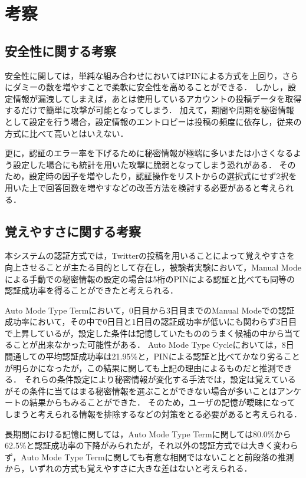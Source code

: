 \chapter{考察}\label{chap:discussion}
\section{安全性に関する考察}\label{sec:safety}
安全性に関しては，単純な組み合わせにおいてはPINによる方式を上回り，さらにダミーの数を増やすことで柔軟に安全性を高めることができる．
しかし，設定情報が漏洩してしまえば，あとは使用しているアカウントの投稿データを取得するだけで簡単に攻撃が可能となってしまう．
加えて，期間や周期を秘密情報として設定を行う場合，設定情報のエントロピーは投稿の頻度に依存し，従来の方式に比べて高いとはいえない．

更に，認証のエラー率を下げるために秘密情報が極端に多いまたは小さくなるよう設定した場合にも統計を用いた攻撃に脆弱となってしまう恐れがある．
そのため，設定時の因子を増やしたり，認証操作をリストからの選択式にせず2択を用いた上で回答回数を増やすなどの改善方法を検討する必要があると考えられる．

\section{覚えやすさに関する考察}\label{sec:memorable}
本システムの認証方式では，Twitterの投稿を用いることによって覚えやすさを向上させることが主たる目的として存在し，被験者実験において，Manual Modeによる手動での秘密情報の設定の場合は5桁のPINによる認証と比べても同等の認証成功率を得ることができたと考えられる．

Auto Mode Type Termにおいて，0日目から3日目までのManual Modeでの認証成功率において，その中で0日目と1日目の認証成功率が低いにも関わらず3日目で上昇しているが，設定した条件は記憶していたもののうまく候補の中から当てることが出来なかった可能性がある．
Auto Mode Type Cycleにおいては，8日間通しての平均認証成功率は21.95\%と，PINによる認証と比べてかなり劣ることが明らかになったが，この結果に関しても上記の理由によるものだと推測できる．
それらの条件設定により秘密情報が変化する手法では，設定は覚えているがその条件に当てはまる秘密情報を選ぶことができない場合が多いことはアンケートの結果からもみることができた．
そのため，ユーザの記憶が曖昧になってしまうと考えられる情報を排除するなどの対策をとる必要があると考えられる．

長期間における記憶に関しては，Auto Mode Type Termに関しては80.0\%から62.5\%と認証成功率の下降がみられたが，それ以外の認証方式では大きく変わらず，Auto Mode Type Termに関しても有意な相関ではないことと前段落の推測から，いずれの方式も覚えやすさに大きな差はないと考えられる．

